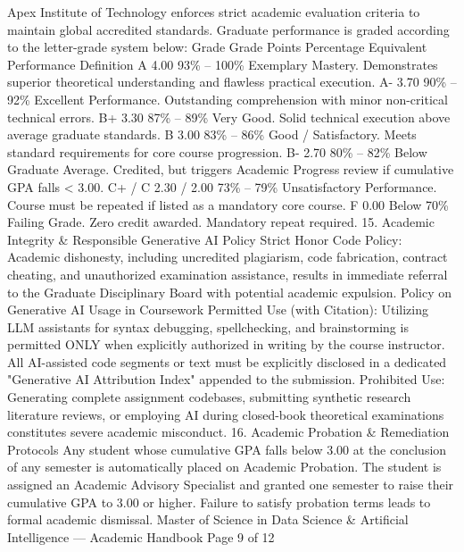 \documentclass[12pt]{article}
\begin{document}
Apex Institute of Technology enforces strict academic evaluation criteria to maintain global accredited standards.
Graduate performance is graded according to the letter-grade system below:
Grade
Grade
Points
Percentage
Equivalent
Performance Definition
A
4.00
93\% – 100\%
Exemplary Mastery. Demonstrates superior theoretical understanding and
flawless practical execution.
A-
3.70
90\% – 92\%
Excellent Performance. Outstanding comprehension with minor non-critical
technical errors.
B+
3.30
87\% – 89\%
Very Good. Solid technical execution above average graduate standards.
B
3.00
83\% – 86\%
Good / Satisfactory. Meets standard requirements for core course progression.
B-
2.70
80\% – 82\%
Below Graduate Average. Credited, but triggers Academic Progress review if
cumulative GPA falls < 3.00.
C+ /
C
2.30 / 2.00
73\% – 79\%
Unsatisfactory Performance. Course must be repeated if listed as a mandatory
core course.
F
0.00
Below 70\%
Failing Grade. Zero credit awarded. Mandatory repeat required.
15. Academic Integrity \& Responsible Generative AI Policy
Strict Honor Code Policy: Academic dishonesty, including uncredited plagiarism, code fabrication, contract
cheating, and unauthorized examination assistance, results in immediate referral to the Graduate Disciplinary
Board with potential academic expulsion.
Policy on Generative AI Usage in Coursework
Permitted Use (with Citation): Utilizing LLM assistants for syntax debugging, spellchecking, and brainstorming is
permitted ONLY when explicitly authorized in writing by the course instructor. All AI-assisted code segments or text must
be explicitly disclosed in a dedicated "Generative AI Attribution Index" appended to the submission.
Prohibited Use: Generating complete assignment codebases, submitting synthetic research literature reviews, or
employing AI during closed-book theoretical examinations constitutes severe academic misconduct.
16. Academic Probation \& Remediation Protocols
Any student whose cumulative GPA falls below 3.00 at the conclusion of any semester is automatically placed on
Academic Probation. The student is assigned an Academic Advisory Specialist and granted one semester to raise
their cumulative GPA to 3.00 or higher. Failure to satisfy probation terms leads to formal academic dismissal.
Master of Science in Data Science \& Artificial Intelligence — Academic Handbook
Page 9 of 12
\end{document}
